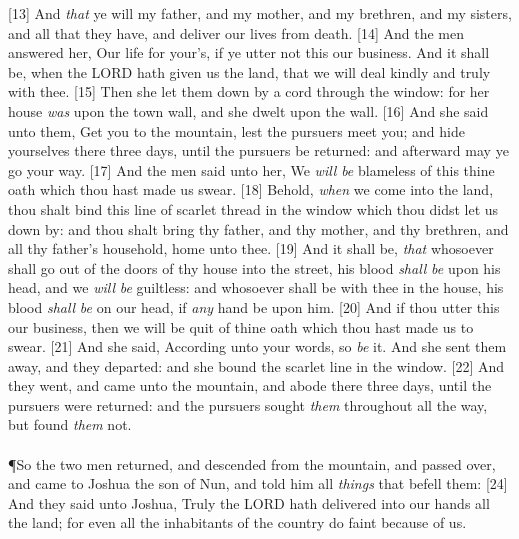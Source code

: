 [13] \textcolor[cmyk]{0.99998,1,0,0}{And \emph{that} ye will  my father, and my mother, and my brethren, and my sisters, and all that they have, and deliver our lives from death.}
[14] \textcolor[cmyk]{0.99998,1,0,0}{And the men answered her, Our life for your's, if ye utter not this our business. And it shall be, when the LORD hath given us the land, that we will deal kindly and truly with thee.}
[15] \textcolor[cmyk]{0.99998,1,0,0}{Then she let them down by a cord through the window: for her house \emph{was} upon the town wall, and she dwelt upon the wall.}
[16] \textcolor[cmyk]{0.99998,1,0,0}{And she said unto them, Get you to the mountain, lest the pursuers meet you; and hide yourselves there three days, until the pursuers be returned: and afterward may ye go your way.}
[17] \textcolor[cmyk]{0.99998,1,0,0}{And the men said unto her, We \emph{will} \emph{be} blameless of this thine oath which thou hast made us swear.}
[18] \textcolor[cmyk]{0.99998,1,0,0}{Behold, \emph{when} we come into the land, thou shalt bind this line of scarlet thread in the window which thou didst let us down by: and thou shalt bring thy father, and thy mother, and thy brethren, and all thy father's household, home unto thee.}
[19] \textcolor[cmyk]{0.99998,1,0,0}{And it shall be, \emph{that} whosoever shall go out of the doors of thy house into the street, his blood \emph{shall} \emph{be} upon his head, and we \emph{will} \emph{be} guiltless: and whosoever shall be with thee in the house, his blood \emph{shall} \emph{be} on our head, if \emph{any} hand be upon him.}
[20] \textcolor[cmyk]{0.99998,1,0,0}{And if thou utter this our business, then we will be quit of thine oath which thou hast made us to swear.}
[21] \textcolor[cmyk]{0.99998,1,0,0}{And she said, According unto your words, so \emph{be} it. And she sent them away, and they departed: and she bound the scarlet line in the window.}
[22] \textcolor[cmyk]{0.99998,1,0,0}{And they went, and came unto the mountain, and abode there three days, until the pursuers were returned: and the pursuers sought \emph{them} throughout all the way, but found \emph{them} not.}\\
\\
\P \textcolor[cmyk]{0.99998,1,0,0}{So the two men returned, and descended from the mountain, and passed over, and came to Joshua the son of Nun, and told him all \emph{things} that befell them:}
[24] \textcolor[cmyk]{0.99998,1,0,0}{And they said unto Joshua, Truly the LORD hath delivered into our hands all the land; for even all the inhabitants of the country do faint because of us.}